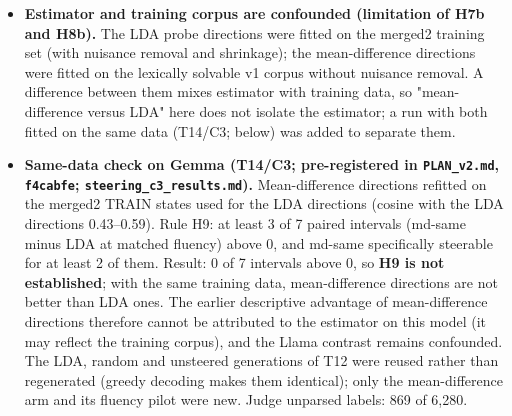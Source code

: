 \documentclass[
  10pt,
]{article}
\begin{document}
\begin{itemize}
  \textbf{Llama fluency-matched follow-up (T13/C1b; pre-registered in
  85e7e53; \texttt{steering\_c1b\_results.md}).} Same model, layer,
  prompts, directions and judge as T10; fluency pilot on grid 0.1--0.8:
  s\_F = 0.4 (probe) and 0.3 (mean-difference), strengths \{0.2, 0.4\}
  and \{0.15, 0.3\}. H8a: probe directions specifically steerable for 0
  of 7 emotions (not established). H8b: paired mean-difference minus
  probe interval above 0 for joy (+0.275 {[}+0.125, +0.425{]}) and
  sadness (+0.150 {[}+0.050, +0.275{]}) only, 2 of 7 (3 needed; not
  established). Mean-difference directions are specific for joy (+0.350
  {[}+0.175, +0.525{]} at 0.3, perplexity ratio 1.24) and sadness
  (+0.175 {[}+0.075, +0.300{]} at 0.3, ratio 1.28). The probe arm
  largely repeats T10 conditions, which a deterministic decoder
  reproduces. Unparsed judge labels: 1/40 unsteered, 6\% for probe,
  5--6\% for mean-difference and 7--8\% for random directions.
\item
  \textbf{Estimator and training corpus are confounded (limitation of
  H7b and H8b).} The LDA probe directions were fitted on the merged2
  training set (with nuisance removal and shrinkage); the
  mean-difference directions were fitted on the lexically solvable v1
  corpus without nuisance removal. A difference between them mixes
  estimator with training data, so "mean-difference versus LDA" here
  does not isolate the estimator; a run with both fitted on the same
  data (T14/C3; below) was added to separate them.
\item
  \textbf{Same-data check on Gemma (T14/C3; pre-registered in
  \texttt{PLAN\_v2.md}, \texttt{f4cabfe};
  \texttt{steering\_c3\_results.md}).} Mean-difference directions
  refitted on the merged2 TRAIN states used for the LDA directions
  (cosine with the LDA directions 0.43--0.59). Rule H9: at least 3 of 7
  paired intervals (md-same minus LDA at matched fluency) above 0, and
  md-same specifically steerable for at least 2 of them. Result: 0 of 7
  intervals above 0, so \textbf{H9 is not established}; with the same
  training data, mean-difference directions are not better than LDA
  ones. The earlier descriptive advantage of mean-difference directions
  therefore cannot be attributed to the estimator on this model (it may
  reflect the training corpus), and the Llama contrast remains
  confounded. The LDA, random and unsteered generations of T12 were
  reused rather than regenerated (greedy decoding makes them identical);
  only the mean-difference arm and its fluency pilot were new. Judge
  unparsed labels: 869 of 6,280.

\end{itemize}
\end{document}
